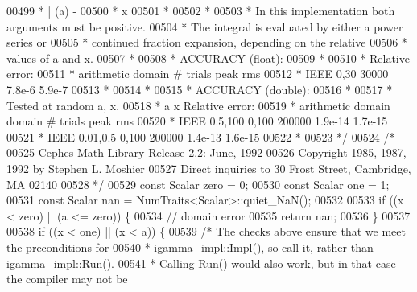 \begin{DoxyCode}
00499 \textcolor{comment}{     *                   | (a)    -}
00500 \textcolor{comment}{     *                             x}
00501 \textcolor{comment}{     *}
00502 \textcolor{comment}{     *}
00503 \textcolor{comment}{     * In this implementation both arguments must be positive.}
00504 \textcolor{comment}{     * The integral is evaluated by either a power series or}
00505 \textcolor{comment}{     * continued fraction expansion, depending on the relative}
00506 \textcolor{comment}{     * values of a and x.}
00507 \textcolor{comment}{     *}
00508 \textcolor{comment}{     * ACCURACY (float):}
00509 \textcolor{comment}{     *}
00510 \textcolor{comment}{     *                      Relative error:}
00511 \textcolor{comment}{     * arithmetic   domain     # trials      peak         rms}
00512 \textcolor{comment}{     *    IEEE      0,30        30000       7.8e-6      5.9e-7}
00513 \textcolor{comment}{     *}
00514 \textcolor{comment}{     *}
00515 \textcolor{comment}{     * ACCURACY (double):}
00516 \textcolor{comment}{     *}
00517 \textcolor{comment}{     * Tested at random a, x.}
00518 \textcolor{comment}{     *                a         x                      Relative error:}
00519 \textcolor{comment}{     * arithmetic   domain   domain     # trials      peak         rms}
00520 \textcolor{comment}{     *    IEEE     0.5,100   0,100      200000       1.9e-14     1.7e-15}
00521 \textcolor{comment}{     *    IEEE     0.01,0.5  0,100      200000       1.4e-13     1.6e-15}
00522 \textcolor{comment}{     *}
00523 \textcolor{comment}{     */}
00524     \textcolor{comment}{/*}
00525 \textcolor{comment}{      Cephes Math Library Release 2.2: June, 1992}
00526 \textcolor{comment}{      Copyright 1985, 1987, 1992 by Stephen L. Moshier}
00527 \textcolor{comment}{      Direct inquiries to 30 Frost Street, Cambridge, MA 02140}
00528 \textcolor{comment}{    */}
00529     \textcolor{keyword}{const} Scalar zero = 0;
00530     \textcolor{keyword}{const} Scalar one = 1;
00531     \textcolor{keyword}{const} Scalar nan = NumTraits<Scalar>::quiet\_NaN();
00532 
00533     \textcolor{keywordflow}{if} ((x < zero) || (a <= zero)) \{
00534       \textcolor{comment}{// domain error}
00535       \textcolor{keywordflow}{return} nan;
00536     \}
00537 
00538     \textcolor{keywordflow}{if} ((x < one) || (x < a)) \{
00539       \textcolor{comment}{/* The checks above ensure that we meet the preconditions for}
00540 \textcolor{comment}{       * igamma\_impl::Impl(), so call it, rather than igamma\_impl::Run().}
00541 \textcolor{comment}{       * Calling Run() would also work, but in that case the compiler may not be}

\end{DoxyCode}

